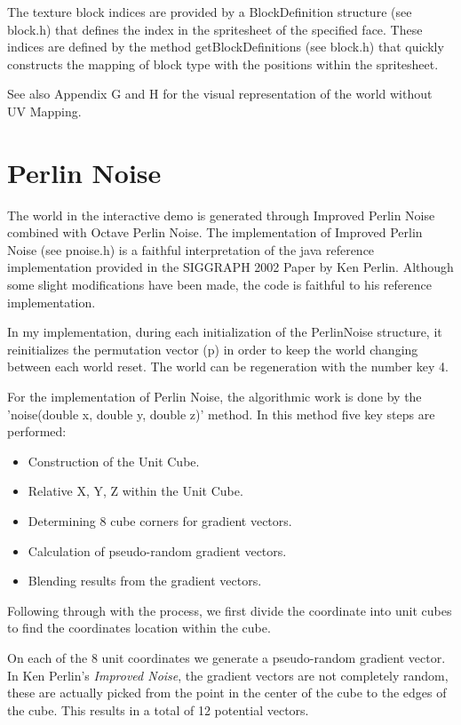 \documentclass{book}
\begin{document}
The texture block indices are provided by a BlockDefinition structure (see block.h) that defines the index in the spritesheet of the specified face.  These indices are defined by the method getBlockDefinitions (see block.h) that quickly constructs the mapping of block type with the positions within the spritesheet.
    
See also Appendix G and H for the visual representation of the world without UV Mapping.
    
\section{Perlin Noise}
The world in the interactive demo is generated through Improved Perlin Noise combined with Octave Perlin Noise.  The implementation of Improved Perlin Noise (see pnoise.h) is a faithful interpretation of the java reference implementation provided in the SIGGRAPH 2002 Paper by Ken Perlin.  Although some slight modifications have been made, the code is faithful to his reference implementation.
    
In my implementation, during each initialization of the PerlinNoise structure, it reinitializes the permutation vector (p) in order to keep the world changing between each world reset.  The world can be regeneration with the number key 4.
    
For the implementation of Perlin Noise, the algorithmic work is done by the 'noise(double x, double y, double z)' method.  In this method five key steps are performed:
    
\begin{itemize}
	\item Construction of the Unit Cube.
	\item Relative X, Y, Z within the Unit Cube.
	\item Determining 8 cube corners for gradient vectors.
	\item Calculation of pseudo-random gradient vectors.
	\item Blending results from the gradient vectors.
\end{itemize}
  
Following through with the process, we first divide the coordinate into unit cubes to find the coordinates location within the cube.
    
On each of the 8 unit coordinates we generate a pseudo-random gradient vector.  In Ken Perlin's \textit{Improved Noise}, the gradient vectors are not completely random, these are actually picked from the point in the center of the cube to the edges of the cube.  This results in a total of 12 potential vectors.
    
\end{document}
